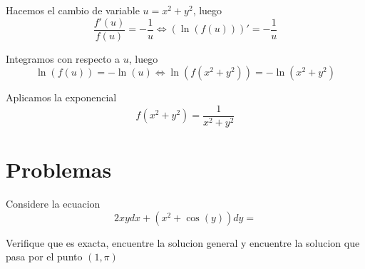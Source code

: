 \documentclass[a4paper,oneside,10.5pt]{article}
\begin{document}
\begin{ejemplo}
\begin{enumerate}
          Hacemos el cambio de variable $u = x^{2} + y^{2}$, luego
          \begin{equation*}
            \frac{f'(u)}{f(u)} = -\frac{1}{u} \iff (\ln(f(u)))' = - \frac{1}{u}
          \end{equation*}

          Integramos con respecto a $u$, luego
          \begin{equation*}
            \ln(f(u)) = - \ln(u) \iff \ln(f(x^{2} + y^{2})) = - \ln(x^{2} + y^{2})
          \end{equation*}

          Aplicamos la exponencial
          \begin{equation*}
            f(x^{2} + y^{2}) = \frac{1}{x^{2} + y^{2}}
          \end{equation*}


  \end{enumerate}
\end{ejemplo}

\section*{Problemas}
\begin{prob}
  Considere la ecuacion
  \begin{equation*}
    2xy dx + (x^{2} + \cos(y)) dy =
  \end{equation*}

  Verifique que es exacta, encuentre la solucion general y encuentre la solucion que pasa por el punto $(1, \pi)$

\end{prob}
\end{document}
